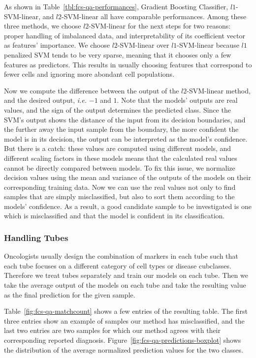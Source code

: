 As shown in Table~\ref{tbl:fcs-qa-performances}, Gradient Boosting Classifier, $l1$-SVM-linear, and $l2$-SVM-linear all have comparable performances. Among these three methods, we choose $l2$-SVM-linear for the next steps for two reasons: proper handling of imbalanced data, and interpretability of its coefficient vector as features' importance. We choose $l2$-SVM-linear over $l1$-SVM-linear because $l1$ penalized SVM tends to be very sparse, meaning that it chooses only a few features as predictors. This results in usually choosing features that correspond to fewer cells and ignoring more abondant cell populations.

Now we compute the difference between the output of the $l2$-SVM-linear method, and the desired output, \emph{i.e.} $-1$ and $1$. Note that the models' outputs are real values, and the sign of the output determines the predicted class. Since the SVM's output shows the distance of the input from its decision boundaries, and the further away the input sample from the boundary, the more confident the model is in its decision, the output can be interpreted as the model's confidence. But there is a catch: these values are computed using different models, and different scaling factors in these models means that the calculated real values cannot be directly compared between models. To fix this issue, we normalize decision values using the mean and variance of the outputs of the models on their corresponding training data. Now we can use the real values not only to find samples that are simply misclassified, but also to sort them according to the models' confidence. As a result, a good candidate sample to be investigated is one which is misclassified and that the model is confident in its classification. 

\subsubsection{Handling Tubes}
Oncologists usually design the combination of markers in each tube such that each tube focuses on a different category of cell types or disease cubclasses. Therefore we treat tubes separately and train our models on each tube. Then we take the average output of the models on each tube and take the resulting value as the final prediction for the given sample.

Table~\ref{fig:fcs-qa-matchcount} shows a few entries of the resulting table. The first three entries show an example of samples our method has misclassified, and the last two entries are two samples for which our method agrees with their corresponding reported diagnosis. Figure~\ref{fig:fcs-qa-predictions-boxplot} shows the distribution of the average normalized prediction values for the two classes.

